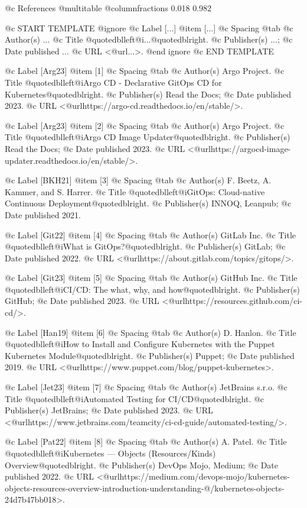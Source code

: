 @c References
@multitable @columnfractions 0.018 0.982


@c START TEMPLATE
@ignore
@c Label [...]
@item [...]
@c Spacing
@tab
@c Author(s)
...
@c Title
@quotedblleft{}@i{...}@quotedblright{}.
@c Publisher(s)
...;
@c Date published
...
@c URL
<@url{...}>.
@end ignore
@c END TEMPLATE


@c Label [Arg23]
@item [1]
@c Spacing
@tab
@c Author(s)
Argo Project.
@c Title
@quotedblleft{}@i{Argo CD - Declarative GitOps CD for Kubernetes}@quotedblright{}.
@c Publisher(s)
Read the Docs;
@c Date published
2023.
@c URL
<@url{https://argo-cd.readthedocs.io/en/stable/}>.

@c Label [Arg23]
@item [2]
@c Spacing
@tab
@c Author(s)
Argo Project.
@c Title
@quotedblleft{}@i{Argo CD Image Updater}@quotedblright{}.
@c Publisher(s)
Read the Docs;
@c Date published
2023.
@c URL
<@url{https://argocd-image-updater.readthedocs.io/en/stable/}>.

@c Label [BKH21]
@item [3]
@c Spacing
@tab
@c Author(s)
F. Beetz, A. Kammer, and S. Harrer.
@c Title
@quotedblleft{}@i{GitOps: Cloud-native Continuous Deployment}@quotedblright{}.
@c Publisher(s)
INNOQ, Leanpub;
@c Date published
2021.

@c Label [Git22]
@item [4]
@c Spacing
@tab
@c Author(s)
GitLab Inc.
@c Title
@quotedblleft{}@i{What is GitOps?}@quotedblright{}.
@c Publisher(s)
GitLab;
@c Date published
2022.
@c URL
<@url{https://about.gitlab.com/topics/gitops/}>.

@c Label [Git23]
@item [5]
@c Spacing
@tab
@c Author(s)
GitHub Inc.
@c Title
@quotedblleft{}@i{CI/CD: The what, why, and how}@quotedblright{}.
@c Publisher(s)
GitHub;
@c Date published
2023.
@c URL
<@url{https://resources.github.com/ci-cd/}>.

@c Label [Han19]
@item [6]
@c Spacing
@tab
@c Author(s)
D. Hanlon.
@c Title
@quotedblleft{}@i{How to Install and Configure Kubernetes with the Puppet Kubernetes Module}@quotedblright{}.
@c Publisher(s)
Puppet;
@c Date published
2019.
@c URL
<@url{https://www.puppet.com/blog/puppet-kubernetes}>.

@c Label [Jet23]
@item [7]
@c Spacing
@tab
@c Author(s)
JetBrains s.r.o.
@c Title
@quotedblleft{}@i{Automated Testing for CI/CD}@quotedblright{}.
@c Publisher(s)
JetBrains;
@c Date published
2023.
@c URL
<@url{https://www.jetbrains.com/teamcity/ci-cd-guide/automated-testing/}>.

@c Label [Pat22]
@item [8]
@c Spacing
@tab
@c Author(s)
A. Patel.
@c Title
@quotedblleft{}@i{Kubernetes — Objects (Resources/Kinds) Overview}@quotedblright{}.
@c Publisher(s)
DevOps Mojo, Medium;
@c Date published
2022.
@c URL
<@url{https://medium.com/devops-mojo/kubernetes-objects-resources-overview-introduction-understanding-@/kubernetes-objects-24d7b47bb018}>.

